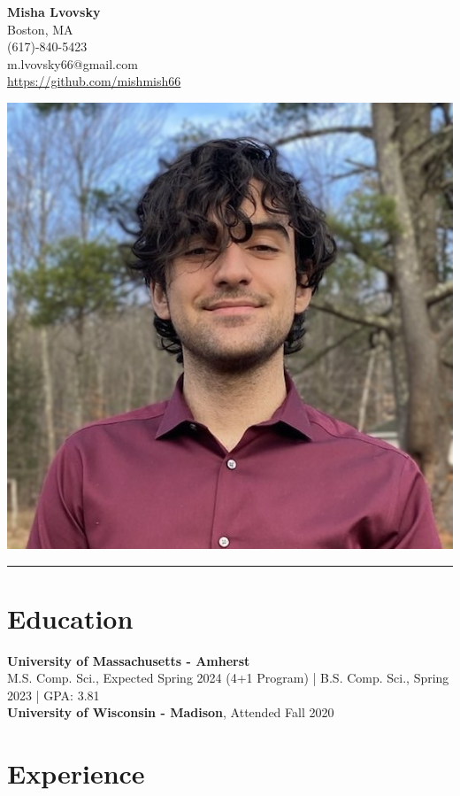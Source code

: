 \documentclass[letterpaper, 10pt]{article}
\begin{document}
\noindent
\begin{minipage}{.65\textwidth}
    \LARGE \textbf{Misha Lvovsky}\\
    \normalsize
    Boston, MA \\
    (617)-840-5423 \\
    m.lvovsky66@gmail.com \\
    \url{https://github.com/mishmish66}
\end{minipage}
\hfill
\begin{minipage}{.2\textwidth}
    \includegraphics[width=\linewidth]{portrait.jpg}
\end{minipage}
\noindent\rule{\textwidth}{0.5pt}

\section*{Education}
\noindent
\textbf{University of Massachusetts - Amherst}\\
M.S. Comp. Sci., Expected Spring 2024 (4+1 Program) | B.S. Comp. Sci., Spring 2023 | GPA: 3.81 \\
\textbf{University of Wisconsin - Madison}, Attended Fall 2020


\section*{Experience}
\end{document}
